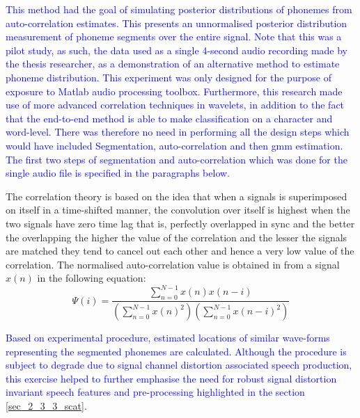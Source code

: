\textcolor{blue}{This method had the goal of simulating posterior distributions of phonemes from auto-correlation estimates.  This presents an unnormalised posterior distribution measurement of phoneme segments over the entire signal.  Note that this was a pilot study, as such, the data used as a single 4-second audio recording made by the thesis researcher, as a demonstration of an alternative method to estimate phoneme distribution.  This experiment was only designed for the purpose of exposure to Matlab audio processing toolbox. Furthermore, this research made use of more advanced correlation techniques in wavelets, in addition to the fact that the end-to-end method is able to make classification on a character and word-level.  There was therefore no need in performing all the design steps which would have included Segmentation, auto-correlation and then \acrfull{gmm} estimation.  The first two steps of segmentation and auto-correlation which was done for the single audio file is specified in the paragraphs below.}

The correlation theory is based on the idea that when a signals is superimposed on itself in a time-shifted manner, the convolution over itself is highest when the two signals have zero time lag that is, perfectly overlapped in sync and the better the overlapping the higher the value of the correlation and the lesser the signals are matched they tend to cancel out each other and hence a very low value of the correlation.  The normalised auto-correlation value is obtained in \cite{picone1996fundamentals} from a signal $x(n)$ in the following equation:
\begin{equation}
    \Psi(i)=\frac{\sum_{n=0}^{N-1}x(n)x(n-i)}{\left(\sum_{n=0}^{N-1}x(n)^2\right)\left(\sum_{n=0}^{N-1}x(n-i)^2\right)}\label{c3eq_corr}
\end{equation}

\textcolor{blue}{Based on experimental procedure, estimated locations of similar wave-forms representing the segmented phonemes are calculated.  Although the procedure is subject to degrade due to signal channel distortion associated speech production, this exercise helped to further emphasise the need for robust signal distortion invariant speech features and pre-processing highlighted in the section \ref{sec_2_3_3_scat}.}

